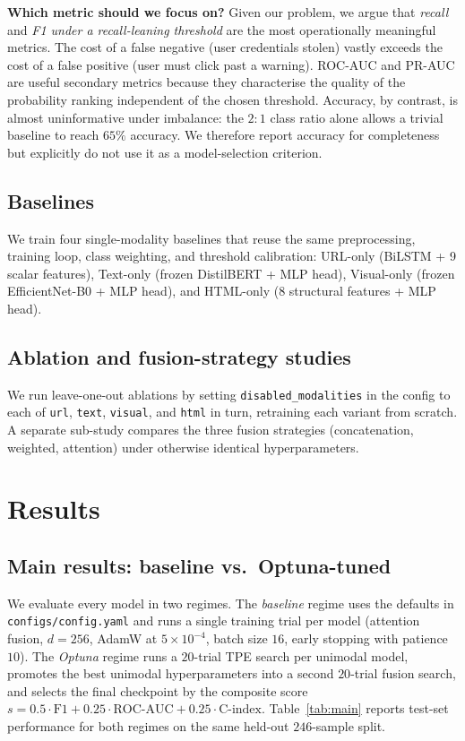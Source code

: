 \documentclass[conference]{IEEEtran}
\begin{document}
\noindent\textbf{Which metric should we focus on?}
Given our problem, we argue that \emph{recall} and \emph{F1 under a
recall-leaning threshold} are the most operationally meaningful
metrics. The cost of a false negative (user credentials stolen)
vastly exceeds the cost of a false positive (user must click past a
warning). ROC-AUC and PR-AUC are useful secondary metrics because
they characterise the quality of the probability ranking
independent of the chosen threshold. Accuracy, by contrast, is
almost uninformative under imbalance: the $2{:}1$ class ratio alone
allows a trivial baseline to reach $65\%$ accuracy. We therefore
report accuracy for completeness but explicitly do not use it as a
model-selection criterion.

\subsection{Baselines}
We train four single-modality baselines that reuse the same
preprocessing, training loop, class weighting, and threshold
calibration: URL-only (BiLSTM + 9 scalar features), Text-only
(frozen DistilBERT + MLP head), Visual-only (frozen EfficientNet-B0
+ MLP head), and HTML-only (8 structural features + MLP head).

\subsection{Ablation and fusion-strategy studies}
We run leave-one-out ablations by setting
\texttt{disabled\_modalities} in the config to each of
\texttt{url}, \texttt{text}, \texttt{visual}, and \texttt{html} in
turn, retraining each variant from scratch. A separate sub-study
compares the three fusion strategies (concatenation, weighted,
attention) under otherwise identical hyperparameters.

\section{Results}
\subsection{Main results: baseline vs.\ Optuna-tuned}
We evaluate every model in two regimes.  The \emph{baseline} regime
uses the defaults in \texttt{configs/config.yaml} and runs a single
training trial per model (attention fusion, $d=256$, AdamW at
$5\!\times\!10^{-4}$, batch size $16$, early stopping with patience
$10$).  The \emph{Optuna} regime runs a $20$-trial TPE search per
unimodal model, promotes the best unimodal hyperparameters into a
second $20$-trial fusion search, and selects the final checkpoint by
the composite score
$s=0.5\cdot\text{F1}+0.25\cdot\text{ROC-AUC}+0.25\cdot\text{C-index}$.
Table~\ref{tab:main} reports test-set performance for both regimes on
the same held-out $246$-sample split.
\end{document}
